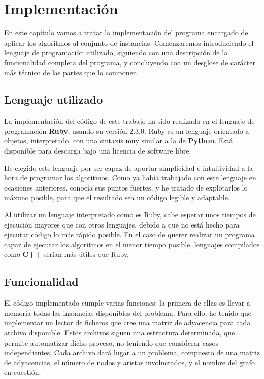 \chapter{Implementación}\label{ch:implementacion}


En este capítulo vamos a tratar la implementación del programa encargado de
aplicar los algoritmos al conjunto de instancias. Comenzaremos introduciendo
el lenguaje de programación utilizado, siguiendo con una descripción de la
funcionalidad completa del programa, y concluyendo con un desglose de carácter
más técnico de las partes que lo componen.

\section{Lenguaje utilizado}

La implementación del código de este trabajo ha sido realizada en el lenguaje de
programación \textbf{Ruby}, usando su versión 2.3.0. Ruby es un lenguaje orientado
a objetos, interpretado, con una sintaxis muy similar a la de \textbf{Python}.
Está disponible para descarga bajo una licencia de software libre.

He elegido este lenguaje por ser capaz de aportar simplicidad e intuitividad a
la hora de programar los algoritmos. Como ya había trabajado con este lenguaje en
ocasiones anteriores, conocía sus puntos fuertes, y he tratado de explotarlos
lo máximo posible, para que el resultado sea un código legible y adaptable.


Al utilizar un lenguaje interpretado como es Ruby, cabe esperar unos
tiempos de ejecución mayores que con otros lenguajes, debido a que no está hecho
para ejecutar código lo más rápido posible. En el caso de querer realizar un programa
capaz de ejecutar los algoritmos en el menor tiempo posible, lenguajes compilados
como \textbf{C++} serían más útiles que Ruby.

\section{Funcionalidad}

El código implementado cumple varias funciones: la primera de ellas es llevar a
memoria todas las instancias disponibles del problema. Para ello, he tenido que
implementar un lector de ficheros que cree una matriz de adyacencia para cada archivo
disponible. Estos archivos siguen una estructura determinada, que permite
automatizar dicho proceso, no teniendo que considerar casos independientes.
Cada archivo dará lugar a un problema, compuesto de una matriz de adyacencias,
el número de nodos y aristas involucrados, y el nombre del grafo en cuestión.

